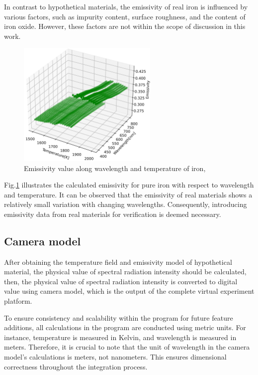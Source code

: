In contrast to hypothetical materials, the emissivity of real iron is 
influenced by various factors, such as impurity content, surface 
roughness, and the content of iron oxide. However, these factors 
are not within the scope of discussion in this work. 


\begin{figure}[htbp]
  \centering
  \includegraphics[width=0.6\textwidth]{figures/emissivity_model_iron.jpg}
  \caption{Emissivity value along wavelength and temperature of iron\cite{Kobatake.2012}, \cite{Watanabe.2003}}
  \label{fig: emissivity_iron}
\end{figure}


Fig.\ref{fig: emissivity_iron} illustrates the calculated 
emissivity for pure iron with respect to wavelength and temperature. 
It can be observed that the emissivity of real materials shows a 
relatively small variation with changing wavelengths. Consequently, 
introducing emissivity data from real materials for verification is 
deemed necessary.





\subsection{Camera model}
After obtaining the temperature field and emissivity model of hypothetical material, 
the physical value of spectral radiation intensity should be calculated, then, 
the physical value of spectral radiation intensity is converted to 
digital value using camera model, which is the output of the complete virtual 
experiment platform. 


To ensure consistency and scalability within the program for future feature 
additions, all calculations in the program are conducted using metric units. 
For instance, temperature is measured in Kelvin, and wavelength is measured in 
meters. Therefore, it is crucial to note that the unit of wavelength in the camera 
model's calculations is meters, not nanometers. This ensures dimensional 
correctness throughout the integration process.


